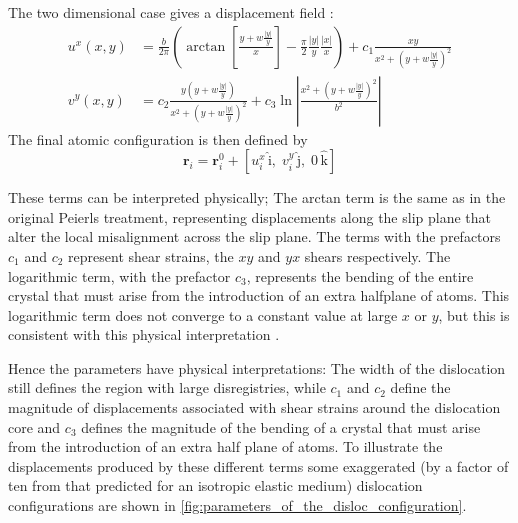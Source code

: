 The two dimensional case gives a displacement field \cite{Eshelby1949,Leibfried1949,nabarro1987theory}:
\begin{subequations}\label{eqn:displacements}
\begin{align}
u^x(x,y) &= \frac{b}{2\pi} \left( \arctan \left[ \frac{y +  w\frac{|y|}{y}}{x} \right] - \frac{\pi}{2} \frac{|y|}{y} \frac{|x|}{x} \right) + c_1 \frac{xy}{x^{2} + (y + w\frac{|y|}{y} )^2} \\
v^y(x,y) &= c_2 \frac{y(y +  w \frac{|y|}{y})}{x^2 + (y +  w \frac{|y|}{y})^2} + c_3 \ln \left| \frac{x^2 + (y +  w \frac{|y|}{y})^2}{b^2} \right|
\end{align}
\label{eqn:displacement_field}
\end{subequations}
The final atomic configuration is then defined by 
\begin{equation}
\bm{r}_i = \bm{r}_i^0 + [u_i^x\,\bm{\mathrm{\hat{i}}},\; v_i^y\,\bm{\mathrm{\hat{j}}},\; 0\,\bm{\mathrm{\hat{k}}}]
\end{equation}

These terms can be interpreted physically; The arctan term is the same as in the original Peierls treatment, representing displacements along the slip plane that alter the local misalignment across the slip plane. The terms with the prefactors $c_1$ and $c_2$ represent shear strains, the $xy$ and $yx$ shears respectively. The logarithmic term, with the prefactor $c_3$, represents the bending of the entire crystal that must arise from the introduction of an extra halfplane of atoms. This logarithmic term does not converge to a constant value at large $x$ or $y$, but this is consistent with this physical interpretation \cite{hirth_lothe1982peierls_displacements}.

Hence the parameters have physical interpretations: The width of the dislocation still defines the region with large disregistries, while $c_1$ and $c_2$ define the magnitude of displacements associated with shear strains around the dislocation core and $c_3$ defines the magnitude of the bending of a crystal that must arise from the introduction of an extra half plane of atoms.
To illustrate the displacements produced by these different terms some exaggerated (by a factor of ten from that predicted for an isotropic elastic medium) dislocation configurations are shown in \autoref{fig:parameters_of_the_disloc_configuration}.




